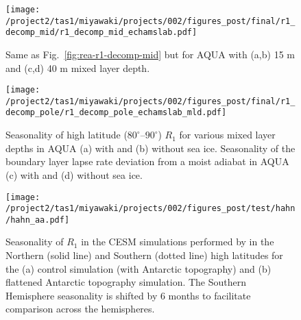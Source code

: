 \documentclass{ametsocV5}
\begin{document}
\begin{figure}[t]
    \noindent\texttt{[image: /project2/tas1/miyawaki/projects/002/figures\_post/final/r1\_decomp\_mid/r1\_decomp\_mid\_echamslab.pdf]}\\
    \caption{Same as Fig.~\ref{fig:rea-r1-decomp-mid} but for AQUA with (a,b) 15 m and (c,d) 40 m mixed layer depth.}
\label{fig:echam-rce}
\end{figure}


\begin{figure}[t]
    \noindent\texttt{[image: /project2/tas1/miyawaki/projects/002/figures\_post/final/r1\_decomp\_pole/r1\_decomp\_pole\_echamslab\_mld.pdf]}\\
    \caption{Seasonality of high latitude ($80^\circ$--$90^\circ$) $R_1$ for various mixed layer depths in AQUA (a) with and (b) without sea ice. Seasonality of the boundary layer lapse rate deviation from a moist adiabat in AQUA (c) with and (d) without sea ice.}
    \label{fig:echam-rae-mld}
\end{figure}


\begin{figure}[t]
    \noindent\texttt{[image: /project2/tas1/miyawaki/projects/002/figures\_post/test/hahn/hahn\_aa.pdf]}\\
    \caption{Seasonality of $R_1$ in the CESM simulations performed by \cite{hahn2020} in the Northern (solid line) and Southern (dotted line) high latitudes for the (a) control simulation (with Antarctic topography) and (b) flattened Antarctic topography simulation. The Southern Hemisphere seasonality is shifted by 6 months to facilitate comparison across the hemispheres.}
    \label{fig:hahn-aa}
\end{figure}
\end{document}
